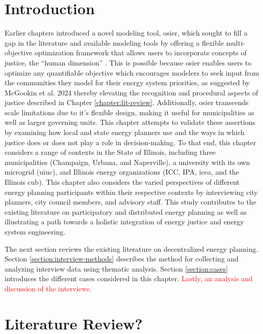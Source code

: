 \section{Introduction}

Earlier chapters introduced a novel modeling tool, \ac{osier}, which sought to
fill a gap in the literature and available modeling tools by offering a flexible
multi-objective optimization framework that allows users to incorporate concepts
of justice, the ``human dimension'' \cite{pfenninger_energy_2014}. This is
possible because \ac{osier} enables users to optimize any quantifiable objective
which encourages modelers to seek input from the communities they model for
their energy system priorities, as suggested by McGookin et al. 2024
\cite{mcgookin_advancing_2024} thereby elevating the recognition and procedural
aspects of justice described in Chapter \ref{chapter:lit-review}. Additionally,
\ac{osier} transcends scale limitations due to it's flexible design, making it
useful for municipalities as well as larger governing units. This chapter
attempts to validate these assertions by examining how local and state energy
planners use  and the ways in which justice does or does not play a
role in decision-making. To that end, this chapter considers a range of contexts
in the State of Illinois, including three municipalities (Champaign, Urbana, and 
Naperville), a university with its own microgrid (\acf{uiuc}), and Illinois energy 
organizations (\acf{ICC}, \acf{IPA}, \acf{icea}, and the Illinois \acf{cub}). This
chapter also considers the varied perspectives of different energy planning participants
within their respective contexts by interviewing city planners,
city council members, and advisory staff. This study contributes to the existing 
literature on participatory and distributed energy planning as well as illustrating
a path towards a holistic integration of energy justice and energy system engineering.

The next section reviews the existing literature on decentralized energy planning. 
Section \ref{section:interview-methods} describes the method for collecting and analyzing
interview data using thematic analysis. Section \ref{section:cases} introduces the different
cases considered in this chapter. \textcolor{red}{Lastly, an analysis and discussion of the interviews.}


\section{Literature Review?}

